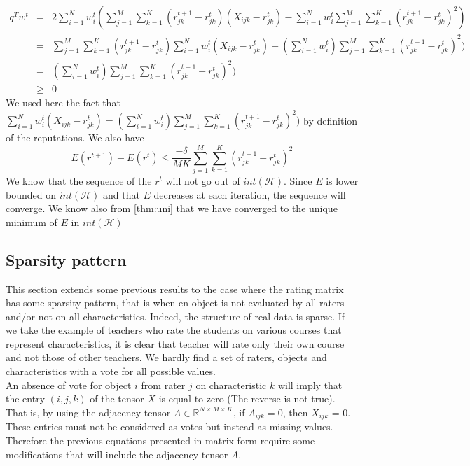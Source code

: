 \documentclass[12pt,a4paper]{article}
\begin{document}
\begin{eqnarray*}
q^Tw^t & = & 2 \sum_{i=1}^N w^t_i (\sum_{j=1}^M \sum_{k=1}^K (r^{t+1}_{jk}-r^t_{jk})(X_{ijk}-r^t_{jk}) - \sum_{i=1}^N w^t_i \sum_{j=1}^M \sum_{k=1}^K  (r^{t+1}_{jk} - r^t_{jk})^2)\\
& = & \sum_{j=1}^M \sum_{k=1}^K (r^{t+1}_{jk}-r^t_{jk}) \sum_{i=1}^N w^t_i (X_{ijk}-r_{jk}^t)- (\sum_{i=1}^N w^t_i) \sum_{j=1}^M \sum_{k=1}^K  (r^{t+1}_{jk} - r^t_{jk})^2)\\
& = & (\sum_{i=1}^N w^t_i) \sum_{j=1}^M \sum_{k=1}^K  (r^{t+1}_{jk} - r^t_{jk})^2)\\
& \geq & 0
\end{eqnarray*}
We used here the fact that $\sum_{i=1}^N w^t_i (X_{ijk}-r_{jk}^t) = (\sum_{i=1}^N w^t_i) \sum_{j=1}^M \sum_{k=1}^K  (r^{t+1}_{jk} - r^t_{jk})^2)$ by definition of the reputations.
We also have 
$$E(r^{t+1})- E(r^t) \leq \frac{-\delta}{MK} \sum_{j=1}^M \sum_{k=1}^K (r^{t+1}_{jk} - r^t_{jk})^2$$
We know that the sequence of the $r^t$ will not go out of $int(\mathcal{H})$.
Since $E$ is lower bounded on $int(\mathcal{H})$ and that $E$ decreases at each iteration, the sequence will converge. We know also from \ref{thm:uni} that we have converged to the unique minimum of $E$ in $int(\mathcal{H})$


\subsection{Sparsity pattern}

This section extends some previous results to the case where the rating matrix has some sparsity pattern, that is when en object is not evaluated by all raters and/or not on all characteristics. Indeed, the structure of real data is sparse. If we take the example of teachers who rate the students on various courses that represent characteristics, it is clear that teacher will rate only their own course and not those of other teachers. We hardly find a set of raters, objects and characteristics with a vote for all possible values.\\

An absence of vote for object $i$ from rater $j$ on characteristic $k$ will imply that the entry $(i, j, k)$ of the tensor $X$ is equal to zero (The reverse is not true). That is, by using the adjacency tensor $A \in \mathbb{R}^{N \times M \times K}$, if $A_{ijk} = 0$, then $X_{ijk}$ = 0. These entries must not be considered as votes but instead as missing values. Therefore the previous equations presented in matrix form require some modifications that will include the adjacency tensor $A$.
\end{document}
